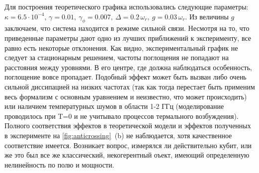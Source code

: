 \documentclass[12pt, twoside]{report}
\numberwithin{equation}{section}
\numberwithin{figure}{section}
\begin{document}
Для построения теоретического графика использовались следующие параметры: $\kappa = 6.5\cdot 10^{-4}$, $\gamma = 0.01,\ \gamma_\phi = 0.007,\ \Delta = 0.2\,\omega_r,\ g=0.03\,\omega_r$. Из величины $g$ заключаем, что система находится в режиме сильной связи. Несмотря на то, что приведенные параметры дают одно из лучших приближений к эксперименту, все равно есть некоторые отклонения. Как видно, экспериментальный график не следует за стационарным решением, частоты поглощения не попадают на расстояния между уровнями. В его центре, где должна наблюдаться особенность, поглощение вовсе пропадает. Подобный эффект может быть вызван либо очень сильной диссипацией на низких частотах (так как тогда перестает быть применим весь формализм с основным уравнением и неизвестно, что может происходить) или наличием температурных шумов в области 1-2 ГГц (моделирование проводилось при T=0 и не учитывало процессов термального возбуждения). Полного соответствия эффектов в теоретической модели и эффектов полученных в эксперименте на \autoref{fig:anticrossing}~(b) не наблюдается, хотя качественное соответствие имеется. Возникает вопрос, измерялся ли действительно кубит, или же это был все же классический, некогерентный оъект, имеющий определенную нелинейность по полю и мощности.
\end{document}
